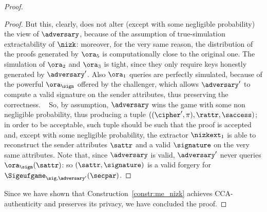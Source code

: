 \begin{proof}
\begin{lemma}
\begin{proof}
            But this, clearly, does not alter (except with some negligible probability) the view of $\adversary$, because of the assumption of true-simulation extractability of $\nizk$: moreover, for the very same reason, the distribution of the proofs generated by $\ora_5$ is computationally close to the original one.
            The simulation of $\ora_2$ and $\ora_3$ is tight, since they only require keys honestly generated by $\adversary'$.
            Also $\ora_1$ queries are perfectly simulated, because of the powerful $\ora_\sign$ offered by the challenger, which allows $\adversary'$ to compute a valid signature on the sender attributes, thus preserving the correctness.
            ~\newline\newline
            So, by assumption, $\adversary$ wins the game with some non negligible probability, thus producing a tuple $((\cipher', \pi), \rattr, \saccess)$; in order to be acceptable, such tuple should be such that the proof is accepted and, except with some negligible probability, the extractor $\nizkext_1$ is able to reconstruct the sender attributes $\sattr$ and a valid $\signature$ on the very same attributes.
            Note that, since $\adversary$ is valid, $\adversary'$ never queries $\ora_\sign(\sattr)$: so $(\sattr, \signature)$ is a valid forgery for $\Sigeufgame_{\sig, \adversary'}(\secpar)$.
        \end{proof}
    \end{lemma}
    Since we have shown that Construction~\ref{constr:me_nizk} achieves CCA-authenticity and preserves its privacy, we have concluded the proof.
\end{proof}
